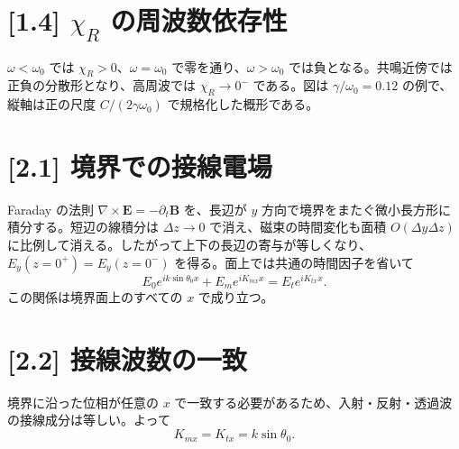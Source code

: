 \documentclass[11pt,a4paper]{article}
\begin{document}
\section*{[1.4] $\chi_R$ の周波数依存性}
$\omega<\omega_0$ では $\chi_R>0$、$\omega=\omega_0$ で零を通り、$\omega>\omega_0$ では負となる。共鳴近傍では正負の分散形となり、高周波では $\chi_R\to0^-$ である。図は $\gamma/\omega_0=0.12$ の例で、縦軸は正の尺度 $C/(2\gamma\omega_0)$ で規格化した概形である。
\begin{center}
\end{center}

\section*{[2.1] 境界での接線電場}
Faraday の法則 $\nabla\times\boldsymbol E=-\partial_t\boldsymbol B$ を、長辺が $y$ 方向で境界をまたぐ微小長方形に積分する。短辺の線積分は $\Delta z\to0$ で消え、磁束の時間変化も面積 $O(\Delta y\Delta z)$ に比例して消える。したがって上下の長辺の寄与が等しくなり、$E_y(z=0^+)=E_y(z=0^-)$ を得る。面上では共通の時間因子を省いて
\[
\boxed{E_0e^{ik\sin\theta_0 x}+E_me^{iK_{mx}x}=E_te^{iK_{tx}x}}.
\]
この関係は境界面上のすべての $x$ で成り立つ。

\section*{[2.2] 接線波数の一致}
境界に沿った位相が任意の $x$ で一致する必要があるため、入射・反射・透過波の接線成分は等しい。よって
\[
\boxed{K_{mx}=K_{tx}=k\sin\theta_0}.
\]
\end{document}

